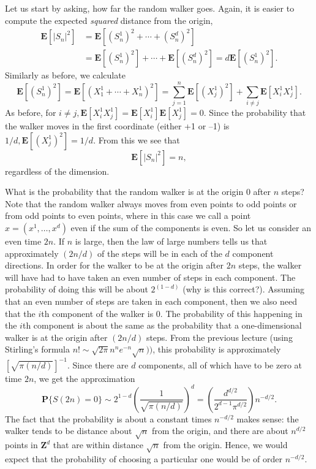 \documentclass{stml-l}
\theoremstyle{definition}
\numberwithin{equation}{chapter}
\numberwithin{figure}{chapter}
\numberwithin{figure}{section}
\begin{document}
Let us start by asking, how far the random walker goes. Again, it is
easier to compute the expected \emph{squared} distance from the
origin,
\begin{align*}
\mathbf{E}[|S_{n}|^{2}]&=\mathbf{E}[(S_{n}^{1})^{2}+\cdots+(S_{n}^{d})^{2}]\\
&=\mathbf{E}[(S_{n}^{1})^{2}]+\cdots+\mathbf{E}[(S_{n}^{d})^{2}]=d\mathbf{E}[(S_{n}^{1})^{2}].
\end{align*}
Similarly as before, we calculate
\begin{equation*}
\mathbf{E}[(S_{n}^{1})^{2}]=\mathbf{E}[(X_{1}^{1}+\cdots+X_{n}^{1})^{2}]=\sum\limits_{j=1}^{n}\mathbf{E}[(X_{j}^{1})^{2}]+\sum\limits_{i\neq
j}\mathbf{E}[X_{i}^{1}X_{j}^{1}].
\end{equation*}
As before, for $i\neq
j,\mathbf{E}[X_{i}^{1}X_{j}^{1}]=\mathbf{E}[X_{i}^{1}]\mathbf{E}[X_{j}^{1}]=0$.
Since the probability that the walker moves in the first coordinate
(either +1 or --1) is $1/d,\mathbf{E}[(X_{j}^{1})^{2}]=1/d$. From
this we see that
\begin{equation*}
\mathbf{E}[|S_{n}|^{2}]=n,
\end{equation*}
regardless of the dimension.

What is the probability that the random walker is at the origin $0$
after $n$ steps? Note that the random walker always moves from even
points to odd points or from odd points to even points, where in
this case we call a point $x= (x^{1},\ldots,x^{d})$ even if the sum
of the components is even. So let us consider an even time $2n$. If
$n$ is large, then the law of large numbers tells us that
approximately $(2n/d)$ of the steps will be in each of the $d$
component directions. In order for the walker to be at the origin
after $2n$ steps, the walker will have had to have taken an even
number of steps in each component. The probability of doing this
will be about $2^{(1-d)}$ (why is this correct?). Assuming that an
even number of steps are taken in each component, then we also need
that the $i$th component of the walker is $0$. The probability of
this happening in the $i$th component is about the same as the
probability that a one-dimensional walker is at the origin after
$(2n/d)$ steps. From the previous lecture (using Stirling's formula
$n!\sim\sqrt{2\pi}n^{n}e^{-n}\sqrt{n}))$, this probability is
approximately $[\sqrt{\pi(n/d)}]^{-1}$. Since there are $d$
components, all of which have to be zero at time $2n$, we get the
approximation
\begin{equation*}
\mathbf{P}\{S(2n)=0\}\sim
2^{1-d}\left(\frac{1}{\sqrt{\pi(n/d)}}\right)^{d}=\left(\frac{d^{d/2}}{2^{d-1}\pi^{d/2}}\right)n^{-d/2}.
\end{equation*}
The fact that the probability is about a constant times $n^{-d/2}$
makes sense: the walker tends to be distance about $\sqrt{n}$ from
the origin, and there are about $n^{d/2}$ points in $\mathbf{Z}^{d}$
that are within distance $\sqrt{n}$ from the origin. Hence, we would
expect that the probability of choosing a particular one would be of
order $n^{-d/2}$.
\end{document}
